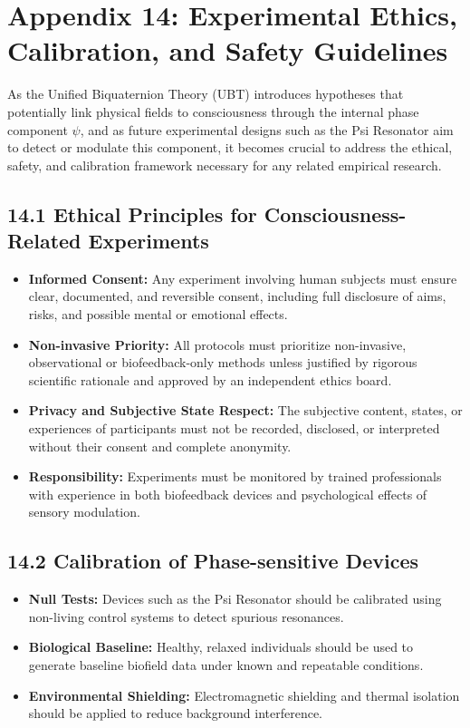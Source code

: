 \section*{Appendix 14: Experimental Ethics, Calibration, and Safety Guidelines}

As the Unified Biquaternion Theory (UBT) introduces hypotheses that potentially link physical fields to consciousness through the internal phase component \(\psi\), and as future experimental designs such as the Psi Resonator aim to detect or modulate this component, it becomes crucial to address the ethical, safety, and calibration framework necessary for any related empirical research.

\subsection*{14.1 Ethical Principles for Consciousness-Related Experiments}

\begin{itemize}
  \item \textbf{Informed Consent:} Any experiment involving human subjects must ensure clear, documented, and reversible consent, including full disclosure of aims, risks, and possible mental or emotional effects.
  \item \textbf{Non-invasive Priority:} All protocols must prioritize non-invasive, observational or biofeedback-only methods unless justified by rigorous scientific rationale and approved by an independent ethics board.
  \item \textbf{Privacy and Subjective State Respect:} The subjective content, states, or experiences of participants must not be recorded, disclosed, or interpreted without their consent and complete anonymity.
  \item \textbf{Responsibility:} Experiments must be monitored by trained professionals with experience in both biofeedback devices and psychological effects of sensory modulation.
\end{itemize}

\subsection*{14.2 Calibration of Phase-sensitive Devices}

\begin{itemize}
  \item \textbf{Null Tests:} Devices such as the Psi Resonator should be calibrated using non-living control systems to detect spurious resonances.
  \item \textbf{Biological Baseline:} Healthy, relaxed individuals should be used to generate baseline biofield data under known and repeatable conditions.
  \item \textbf{Environmental Shielding:} Electromagnetic shielding and thermal isolation should be applied to reduce background interference.
\end{itemize}

